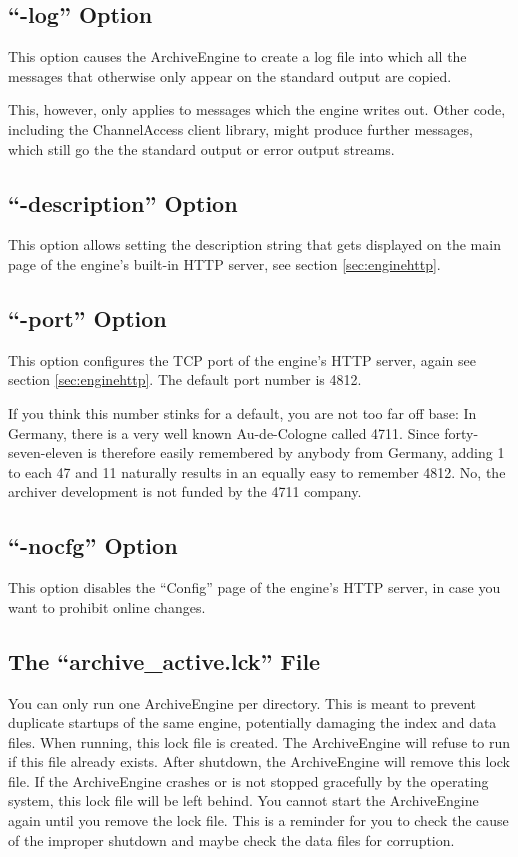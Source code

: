 \subsection{``-log'' Option}
This option causes the ArchiveEngine to create a log file into which
all the messages that otherwise only appear on the standard output are
copied.

This, however, only applies to messages which the engine writes
out. Other code, including the ChannelAccess client library, might
produce further messages, which still go the the standard output or
error output streams.

\subsection{``-description'' Option} \label{sec:enginedesc}
This option allows setting the description string that gets displayed
on the main page of the engine's built-in HTTP server, see
section \ref{sec:enginehttp}.

\subsection{``-port'' Option} \label{sec:engineport}
This option configures the TCP port of the engine's HTTP server, again
see section \ref{sec:enginehttp}. The default port number is 4812.

If you think this number stinks for a default, you are not too far off
base: In Germany, there is a very well known Au-de-Cologne called
4711.  Since forty-seven-eleven is therefore easily remembered by
anybody from Germany, adding 1 to each 47 and 11 naturally results in
an equally easy to remember 4812.
No, the archiver development is not funded by the 4711 company.

\subsection{``-nocfg'' Option}
This option disables the ``Config'' page of the engine's HTTP server,
in case you want to prohibit online changes.

\subsection{The ``archive\_active.lck'' File}
You can only run one ArchiveEngine per directory. This is meant to
prevent duplicate startups of the same engine, potentially damaging
the index and data files. When running, this lock file is
created. The ArchiveEngine will refuse to run if this file already
exists.  After shutdown, the ArchiveEngine will remove this lock file.
If the ArchiveEngine crashes or is not stopped gracefully by the
operating system, this lock file will be left behind.  You cannot
start the ArchiveEngine again until you remove the lock file. This is
a reminder for you to check the cause of the improper shutdown and
maybe check the data files for corruption.

